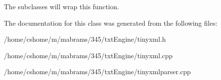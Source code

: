 The subclasses will wrap this function. 

The documentation for this class was generated from the following files:\begin{DoxyCompactItemize}
\item 
/home/cshome/m/mabrams/345/txtEngine/tinyxml.h\item 
/home/cshome/m/mabrams/345/txtEngine/tinyxml.cpp\item 
/home/cshome/m/mabrams/345/txtEngine/tinyxmlparser.cpp\end{DoxyCompactItemize}
